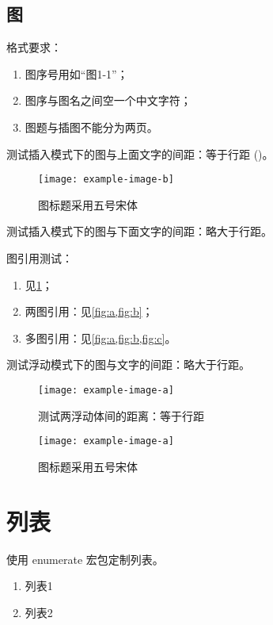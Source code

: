 \subsection{图}

格式要求：

\begin{enumerate}
	\item	图序号用如``图1-1''；
	\item 图序与图名之间空一个中文字符；
	\item 图题与插图不能分为两页。
\end{enumerate}

测试插入模式下的图与上面文字的间距：等于行距 (\the\textfloatsep)。

\begin{figure}[h]
	\centering
	\texttt{[image: example-image-b]}
	\caption{图标题采用五号宋体}
	\label{fig:a}
\end{figure}

测试插入模式下的图与下面文字的间距：略大于行距。

图引用测试：

\begin{enumerate}
	\item	见\cref{fig:a}；
	\item 两图引用：见\cref{fig:a,fig:b}；
	\item 多图引用：见\cref{fig:a,fig:b,fig:c}。
\end{enumerate}

\clearpage

测试浮动模式下的图与文字的间距：略大于行距。

\begin{figure}[t]
	\centering
	\texttt{[image: example-image-a]}
	\caption{测试两浮动体间的距离：等于行距}
	\label{fig:b}
\end{figure}

\begin{figure}[t]
	\centering
	\texttt{[image: example-image-a]}
	\caption{图标题采用五号宋体}
	\label{fig:c}
\end{figure}

\section{列表}

使用 \textsf{enumerate} 宏包定制列表。

\begin{enumerate}
	\item 列表1
	\item 列表2
\end{enumerate}

